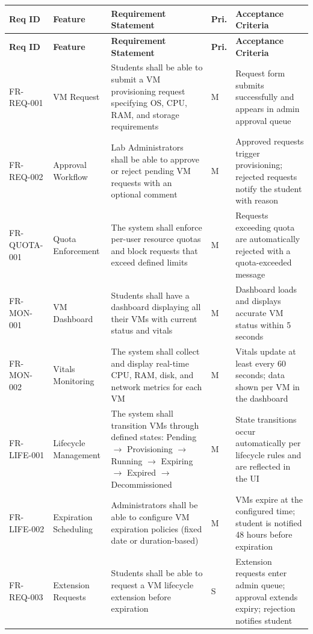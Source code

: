 \documentclass[12pt,letterpaper]{article}
\begin{document}
\begin{longtable}{L{2.4cm} L{2.4cm} L{5cm} C{1.2cm} L{3.5cm}}
  \toprule
  \textbf{Req ID} & \textbf{Feature} & \textbf{Requirement Statement} & \textbf{Pri.} & \textbf{Acceptance Criteria} \\
  \midrule
  \endfirsthead
  \toprule
  \textbf{Req ID} & \textbf{Feature} & \textbf{Requirement Statement} & \textbf{Pri.} & \textbf{Acceptance Criteria} \\
  \midrule
  \endhead
  \bottomrule
  \endfoot

  FR-REQ-001 & VM Request & Students shall be able to submit a VM provisioning request specifying OS, CPU, RAM, and storage requirements & M & Request form submits successfully and appears in admin approval queue \\
  \addlinespace
  FR-REQ-002 & Approval Workflow & Lab Administrators shall be able to approve or reject pending VM requests with an optional comment & M & Approved requests trigger provisioning; rejected requests notify the student with reason \\
  \addlinespace
  FR-QUOTA-001 & Quota Enforcement & The system shall enforce per-user resource quotas and block requests that exceed defined limits & M & Requests exceeding quota are automatically rejected with a quota-exceeded message \\
  \addlinespace
  FR-MON-001 & VM Dashboard & Students shall have a dashboard displaying all their VMs with current status and vitals & M & Dashboard loads and displays accurate VM status within 5 seconds \\
  \addlinespace
  FR-MON-002 & Vitals Monitoring & The system shall collect and display real-time CPU, RAM, disk, and network metrics for each VM & M & Vitals update at least every 60 seconds; data shown per VM in the dashboard \\
  \addlinespace
  FR-LIFE-001 & Lifecycle Management & The system shall transition VMs through defined states: Pending $\to$ Provisioning $\to$ Running $\to$ Expiring $\to$ Expired $\to$ Decommissioned & M & State transitions occur automatically per lifecycle rules and are reflected in the UI \\
  \addlinespace
  FR-LIFE-002 & Expiration Scheduling & Administrators shall be able to configure VM expiration policies (fixed date or duration-based) & M & VMs expire at the configured time; student is notified 48 hours before expiration \\
  \addlinespace
  FR-REQ-003 & Extension Requests & Students shall be able to request a VM lifecycle extension before expiration & S & Extension requests enter admin queue; approval extends expiry; rejection notifies student \\

\end{longtable}
\end{document}
